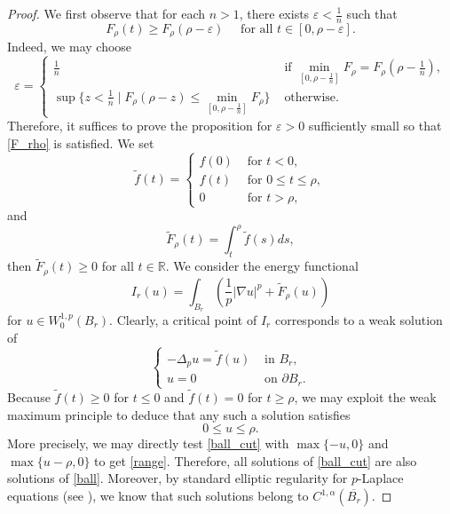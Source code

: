 \documentclass[reqno]{amsart}
\theoremstyle{plain}
\theoremstyle{definition}
\theoremstyle{remark}
\begin{document}
	\begin{proof}
		We first observe that for each $n>1$, there exists $\varepsilon<\frac{1}{n}$ such that
		\begin{equation}\label{F_rho}
			F_\rho(t) \ge F_\rho(\rho-\varepsilon) \quad\text{ for all } t\in[0,\rho-\varepsilon].
		\end{equation}
		Indeed, we may choose
		\[
		\varepsilon = 
		\begin{cases}
			\frac{1}{n} & \text{ if } \min_{[0,\rho-\frac{1}{n}]} F_\rho = F_\rho(\rho-\frac{1}{n}),\\
			\sup\{z<\frac{1}{n} \mid F_\rho(\rho-z)\le \min_{[0,\rho-\frac{1}{n}]} F_\rho \} & \text{ otherwise}.
		\end{cases}
		\]
		Therefore, it suffices to prove the proposition for $\varepsilon>0$ sufficiently small so that \eqref{F_rho} is satisfied. We set
		\[
		\tilde{f}(t) = 
		\begin{cases}
			f(0) &\text{ for } t<0,\\
			f(t) &\text{ for } 0\le t\le\rho,\\
			0 &\text{ for } t>\rho,
		\end{cases}
		\]
		and
		\[
		\tilde{F}_\rho(t) = \int_{t}^{\rho} \tilde{f}(s) ds,
		\]
		then $\tilde{F}_\rho(t)\ge0$ for all $t\in\mathbb{R}$. We consider the energy functional
		\[
		I_r(u) = \int_{B_r} \left(\frac{1}{p}|\nabla u|^p + \tilde{F}_\rho(u)\right)
		\]
		for $u\in W^{1,p}_0(B_r)$. Clearly, a critical point of $I_r$ corresponds to a weak solution of
		\begin{equation}\label{ball_cut}
			\begin{cases}
				-\Delta_p u = \tilde{f}(u) &\text{ in } B_r,\\
				u = 0 &\text{ on } \partial B_r.
			\end{cases}
		\end{equation}
		Because $\tilde{f}(t)\ge0$ for $t\le0$ and $\tilde{f}(t)=0$ for $t\ge\rho$, we may exploit the weak maximum principle to deduce that any such a solution satisfies
		\begin{equation}\label{range}
			0 \le u \le \rho.
		\end{equation}
		More precisely, we may directly test \eqref{ball_cut} with $\max\{-u,0\}$ and $\max\{u-\rho,0\}$ to get \eqref{range}.
		Therefore, all solutions of \eqref{ball_cut} are also solutions of \eqref{ball}. Moreover, by standard elliptic regularity for $p$-Laplace equations (see \cite{MR709038,MR727034,MR969499}), we know that such solutions belong to $C^{1,\alpha}(\overline{B_r})$.
		

\end{proof}
\end{document}
